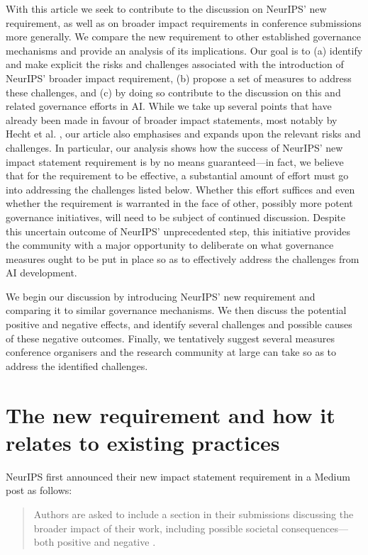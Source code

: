 \documentclass[11pt,english]{article}
\begin{document}
With this article we seek to contribute to the discussion on NeurIPS' new requirement, as well as on broader impact requirements in conference submissions more generally. We compare the new requirement to other established governance mechanisms and provide an analysis of its implications. Our goal is to (a) identify and make explicit the risks and challenges associated with the introduction of NeurIPS' broader impact requirement, (b) propose a set of measures to address these challenges, and (c) by doing so contribute to the discussion on this and related governance efforts in AI. While we take up several points that have already been made in favour of broader impact statements, most notably by Hecht et al. \citep{hecht_its_2018}, our article also emphasises and expands upon the relevant risks and challenges. In particular, our analysis shows how the success of NeurIPS' new impact statement requirement is by no means guaranteed---in fact, we believe that for the requirement to be effective, a substantial amount of effort must go into addressing the challenges listed below. Whether this effort suffices and even whether the requirement is warranted in the face of other, possibly more potent governance initiatives, will need to be subject of continued discussion. Despite this uncertain outcome of NeurIPS' unprecedented step, this initiative provides the community with a major opportunity to deliberate on what governance measures ought to be put in place so as to effectively address the challenges from AI development. 

We begin our discussion by introducing NeurIPS' new requirement and comparing it to similar governance mechanisms. We then discuss the potential positive and negative effects, and identify several challenges and possible causes of these negative outcomes. Finally, we tentatively suggest several measures conference organisers and the research community at large can take so as to address the identified challenges.
\section{The new requirement and how it relates to existing practices}
NeurIPS first announced their new impact statement requirement in a Medium post as follows:

\begin{quote}
\small Authors are asked to include a section in their submissions discussing the broader impact of their work, including possible societal consequences---both positive and negative \citep{neurips_call_2020}.
\end{quote}
\end{document}
